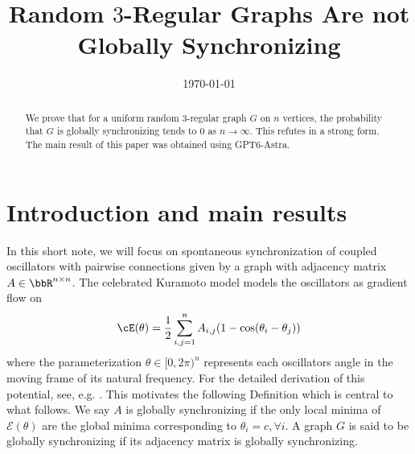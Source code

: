 \documentclass[11pt,reqno]{amsart}
\title{Random $3$-Regular Graphs Are not Globally Synchronizing}
\author{}
\date{\today}
\begin{document}
\begin{abstract}
    We prove that for a uniform random $3$-regular graph $G$ on $n$ vertices, the probability that $G$ is globally synchronizing tends to $0$ as $n \to \infty$. This refutes \cite[Conjecture~3]{bandeira2026randomstrasse101} in a strong form.
    The main result of this paper was obtained using GPT6-Astra.
\end{abstract}

\maketitle

\setcounter{tocdepth}{1}
\tableofcontents

\section{Introduction and main results}
\label{s:intro}

In this short note, we will focus on spontaneous synchronization of  coupled oscillators with pairwise connections given by a graph with adjacency matrix $A \in \bbR^{n \times n}$. The celebrated Kuramoto model \cite{kuramoto2005self} models the oscillators as gradient flow on
\begin{equation}{\label{eq:energy}}
    \cE(\theta) = \frac{1}{2} \sum_{i,j=1}^{n} A_{i,j}(1-\cos(\theta_i-\theta_j))
\end{equation}
where the parameterization $\theta\in[0,2\pi)^n$ represents each oscillators angle in the moving frame of its natural frequency. For the detailed derivation of this potential, see, e.g. \cite{abdalla2026expander}. This motivates the following Definition which is central to what follows. We say $A$ is globally synchronizing if the only local minima of $\mathcal E(\theta)$ are the global minima corresponding to $\theta_i=c,\forall i$. A graph $G$ is said to be globally synchronizing if its adjacency matrix is globally synchronizing.
\end{document}
